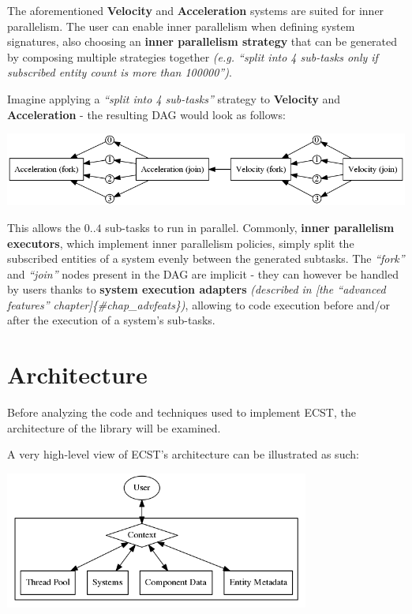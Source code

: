 \documentclass[twoside, 12pt, a4paper, openany]{book}
\let\origfigure=\figure
\let\endorigfigure=\endfigure
\renewenvironment{figure}[1][]{%
\origfigure[H]
}{%
\endorigfigure
}
\begin{document}
The aforementioned \textbf{Velocity} and \textbf{Acceleration} systems
are suited for inner parallelism. The user can enable inner parallelism
when defining system signatures, also choosing an \textbf{inner
parallelism strategy} that can be generated by composing multiple
strategies together \emph{(e.g. ``split into 4 sub-tasks only if
subscribed entity count is more than 100000'')}.

Imagine applying a \emph{``split into 4 sub-tasks''} strategy to
\textbf{Velocity} and \textbf{Acceleration} - the resulting DAG would
look as follows:

\begin{figure}[htbp]
\centering
\includegraphics{source/figures/generated/ecst/overview/multithreading/inner/dag0.png}
\caption{ECST multithreading: example inner parallelism DAG}
\end{figure}

This allows the \(0..4\) sub-tasks to run in parallel. Commonly,
\textbf{inner parallelism executors}, which implement inner parallelism
policies, simply split the subscribed entities of a system evenly
between the generated subtasks. The \emph{``fork''} and \emph{``join''}
nodes present in the DAG are implicit - they can however be handled by
users thanks to \textbf{system execution adapters} \emph{(described in
{[}the ``advanced features'' chapter{]}\{\#chap\_advfeats\})}, allowing
to code execution before and/or after the execution of a system's
sub-tasks.

\chapter{Architecture}\label{architecture}

Before analyzing the code and techniques used to implement ECST, the
architecture of the library will be examined.

A very high-level view of ECST's architecture can be illustrated as
such:

\begin{figure}[htbp]
\centering
\includegraphics[width=0.75000\textwidth]{source/figures/generated/ecst/architecture/high_level.png}
\caption{ECST architecture: high-level overview}
\end{figure}
\end{document}
